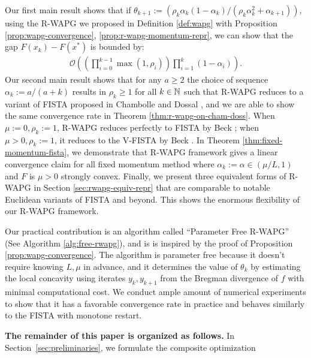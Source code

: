 \documentclass[12pt]{article}
\begin{document}
        Our first main result shows that if $\theta_{k + 1} := (\rho_k\alpha_k(1 - \alpha_k)/(\rho_k\alpha_k^2 + \alpha_{k + 1}))$, using the R-WAPG we proposed in Definition \ref{def:wapg} with Proposition \ref{prop:wapg-convergence}, \ref{prop:r-wapg-momentum-repr}, we can show that the gap $F(x_k) - F(x^*)$ is bounded by:
        \begin{align*}
            \mathcal O\left(
                \left(
                    \prod_{i = 0}^{k - 1} \max(1, \rho_{i})
                \right)
                \prod_{i = 1}^{k} \left(1  - \alpha_i\right)
            \right).
        \end{align*}
        Our second main result shows that for any $a \ge 2$ the choice of sequence $\alpha_k := a/(a + k)$ results in $\rho_k \geq 1$ for all $k \in \mathbb N$ such that R-WAPG reduces to a variant of FISTA proposed in Chambolle and Dossal \cite{chambolle_convergence_2015}, and we are able to show the same convergence rate in Theorem \ref{thm:r-wapg-on-cham-doss}.
        When $\mu := 0, \rho_k := 1$, R-WAPG reduces perfectly to FISTA by Beck \cite{beck_first-order_2017}; when $\mu > 0, \rho_k := 1$, it reduces to the V-FISTA by Beck \cite{beck_first-order_2017}.
        In Theorem \ref{thm:fixed-momentum-fista}, we demonstrate that R-WAPG framework gives a linear convergence claim for all fixed momentum method where $\alpha_k := \alpha \in (\mu/L, 1)$ and  $F$ is $\mu > 0$ strongly convex.
        Finally, we present three equivalent forms of R-WAPG in Section \ref{sec:rwapg-equiv-repr} that are comparable to notable Euclidean variants of FISTA and beyond. This shows the enormous flexibility of our R-WAPG framework.
        \par
        Our practical contribution is an algorithm called ``Parameter Free R-WAPG'' (See Algorithm \ref{alg:free-rwapg}), and is is inspired by the proof of Proposition \ref{prop:wapg-convergence}.
        The algorithm is parameter free because it doesn't require knowing $L, \mu$ in advance, and it determines the value of $\theta_k$ by estimating the local concavity using iterates $y_{k}, y_{k + 1}$ from the Bregman divergence of $f$ with minimal computational cost.
        We conduct ample amount of numerical experiments to show that it has a favorable convergence rate in practice and behaves similarly to the FISTA with monotone restart.
        \par
        \textbf{The remainder of this paper is organized as follows. }
        In Section~\ref{sec:preliminaries}, we formulate the composite optimization
\end{document}
